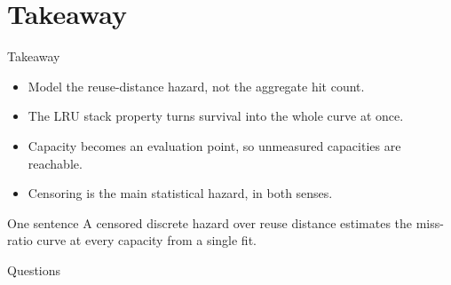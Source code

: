 \section{Takeaway}

\begin{frame}{Takeaway}
  \begin{itemize}
    \item Model the reuse-distance hazard, not the aggregate hit count.
    \item The LRU stack property turns survival into the whole curve at once.
    \item Capacity becomes an evaluation point, so unmeasured capacities are
      reachable.
    \item Censoring is the main statistical hazard, in both senses.
  \end{itemize}
  \vspace{1.5em}
  \begin{block}{One sentence}
    A censored discrete hazard over reuse distance estimates the miss-ratio
    curve at every capacity from a single fit.
  \end{block}
\end{frame}

\begin{frame}[standout]
  Questions
\end{frame}
